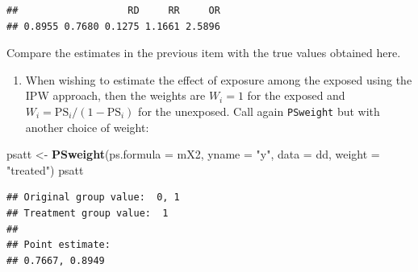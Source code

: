 \documentclass[
]{book}
\newenvironment{Shaded}{\begin{snugshade}}{\end{snugshade}}
\newcommand{\AttributeTok}[1]{\textcolor[rgb]{0.13,0.29,0.53}{#1}}
\newcommand{\DecValTok}[1]{\textcolor[rgb]{0.00,0.00,0.81}{#1}}
\newcommand{\FunctionTok}[1]{\textcolor[rgb]{0.13,0.29,0.53}{\textbf{#1}}}
\newcommand{\NormalTok}[1]{#1}
\newcommand{\OtherTok}[1]{\textcolor[rgb]{0.56,0.35,0.01}{#1}}
\newcommand{\SpecialCharTok}[1]{\textcolor[rgb]{0.81,0.36,0.00}{\textbf{#1}}}
\newcommand{\StringTok}[1]{\textcolor[rgb]{0.31,0.60,0.02}{#1}}
\providecommand{\tightlist}{%
  \setlength{\itemsep}{0pt}\setlength{\parskip}{0pt}}
\begin{document}
\begin{Shaded}
\end{Shaded}

\begin{verbatim}
##                   RD     RR     OR 
## 0.8955 0.7680 0.1275 1.1661 2.5896
\end{verbatim}

Compare the estimates in the previous item with the
true values obtained here.

\begin{enumerate}
\def\labelenumi{\arabic{enumi}.}
\setcounter{enumi}{3}
\tightlist
\item
  When wishing to estimate
  the effect of exposure among the exposed using the IPW
  approach, then the weights are \(W_i = 1\) for the exposed and
  \(W_i = \text{PS}_i/(1-\text{PS}_i)\) for the unexposed.
  Call again \texttt{PSweight} but with another choice of weight:
\end{enumerate}

\begin{Shaded}
\begin{Highlighting}[]
\NormalTok{psatt }\OtherTok{\textless{}{-}} \FunctionTok{PSweight}\NormalTok{(}\AttributeTok{ps.formula =}\NormalTok{ mX2, }\AttributeTok{yname =} \StringTok{"y"}\NormalTok{, }\AttributeTok{data =}\NormalTok{ dd, }\AttributeTok{weight =} \StringTok{"treated"}\NormalTok{)}
\NormalTok{psatt}
\end{Highlighting}
\end{Shaded}

\begin{verbatim}
## Original group value:  0, 1 
## Treatment group value:  1 
## 
## Point estimate: 
## 0.7667, 0.8949
\end{verbatim}

\begin{Shaded}
\end{Shaded}
\end{document}
